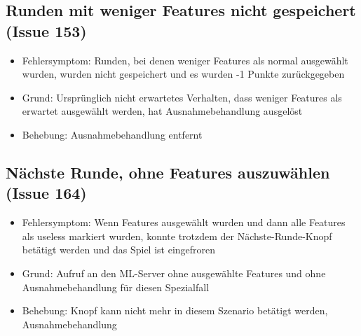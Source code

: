 \documentclass[a4paper]{scrreprt}
\begin{document}
    \subsection{Runden mit weniger Features nicht gespeichert (Issue 153)}
    \begin{itemize}
    \item Fehlersymptom: Runden, bei denen weniger Features als normal ausgewählt
     wurden, wurden nicht gespeichert und es wurden -1 Punkte zurückgegeben
    \item Grund: Ursprünglich nicht erwartetes Verhalten, dass weniger Features
     als erwartet ausgewählt werden, hat Ausnahmebehandlung ausgelöst
    \item Behebung: Ausnahmebehandlung entfernt
    \end{itemize}
    \subsection{Nächste Runde, ohne Features auszuwählen (Issue 164)}
    \begin{itemize}
    \item Fehlersymptom: Wenn Features ausgewählt wurden und dann alle Features
     als useless markiert wurden, konnte trotzdem der Nächste-Runde-Knopf betätigt 
     werden und das Spiel ist eingefroren
    \item Grund: Aufruf an den ML-Server ohne ausgewählte Features und ohne
     Ausnahmebehandlung für diesen Spezialfall
    \item Behebung: Knopf kann nicht mehr in diesem Szenario betätigt werden, Ausnahmebehandlung
    \end{itemize}
\end{document}
